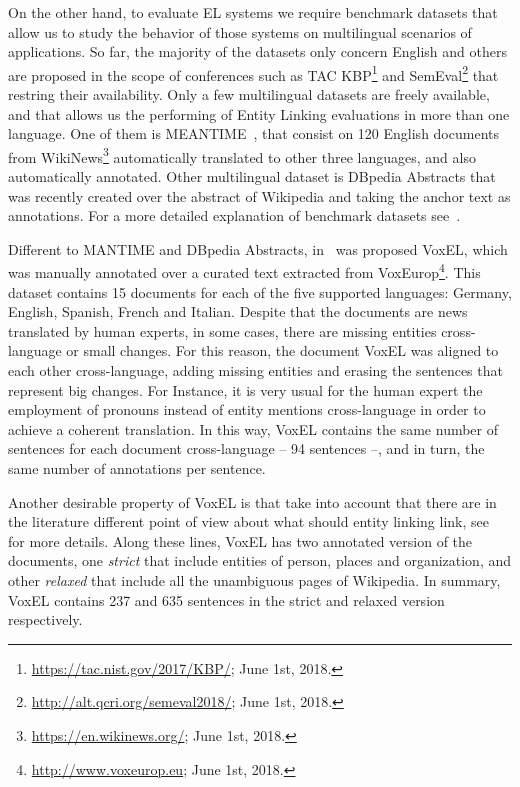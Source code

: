 \documentclass{llncs}
\begin{document}
On the other hand, to evaluate EL systems we require benchmark datasets that allow us to study the behavior of those systems on multilingual scenarios of applications. So far, the majority of the datasets only concern English and others are proposed in the scope of conferences such as TAC KBP\footnote{\url{https://tac.nist.gov/2017/KBP/}; June 1st, 2018.} and SemEval\footnote{\url{http://alt.qcri.org/semeval2018/}; June 1st, 2018.} that restring their availability. Only a few multilingual datasets are freely available, and that allows us the performing of Entity Linking evaluations in more than one language. One of them is MEANTIME~\cite{meantime16}, that consist on 120 English documents from WikiNews\footnote{\url{https://en.wikinews.org/}; June 1st, 2018.} automatically translated to other three languages, and also automatically annotated. Other multilingual dataset is DBpedia Abstracts that was recently created over the abstract of Wikipedia and taking the anchor text as annotations. For a more detailed explanation of benchmark datasets see~\cite{ourISWC}.

Different to MANTIME and DBpedia Abstracts, in~\cite{ourISWC} was proposed VoxEL, which was manually annotated over a curated text extracted from VoxEurop\footnote{\url{http://www.voxeurop.eu}; June 1st, 2018.}. This dataset contains 15 documents for each of the five supported languages: Germany, English, Spanish, French and Italian. Despite that the documents are news translated by human experts, in some cases, there are missing entities cross-language or small changes. For this reason, the document VoxEL was aligned to each other cross-language, adding missing entities and erasing the sentences that represent big changes. For Instance, it is very usual for the human expert the employment of pronouns instead of entity mentions cross-language in order to achieve a coherent translation. In this way, VoxEL contains the same number of sentences for each document cross-language -- 94 sentences --, and in turn, the same number of annotations per sentence. 

Another desirable property of VoxEL is that take into account that there are in the literature different point of view about what should entity linking link, see~\cite{ourAMW2018} for more details. Along these lines, VoxEL has two annotated version of the documents, one \textit{strict} that include entities of person, places and organization, and other \textit{relaxed} that include all the unambiguous pages of Wikipedia. In summary, VoxEL contains 237 and 635 sentences in the strict and relaxed version respectively.
\end{document}
